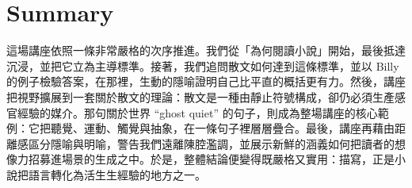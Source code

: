 \section{Summary}

這場講座依照一條非常嚴格的次序推進。我們從「為何閱讀小說」開始，最後抵達沉浸，並把它立為主導標準。接著，我們追問散文如何達到這條標準，並以 Billy 的例子檢驗答案，在那裡，生動的隱喻證明自己比平直的概括更有力。然後，講座把視野擴展到一套關於散文的理論：散文是一種由靜止符號構成，卻仍必須生產感官經驗的媒介。那句關於世界 ``ghost quiet'' 的句子，則成為整場講座的核心範例：它把聽覺、運動、觸覺與抽象，在一條句子裡層層疊合。最後，講座再藉由距離感區分隱喻與明喻，警告我們遠離陳腔濫調，並展示新鮮的涵義如何把讀者的想像力招募進場景的生成之中。於是，整體結論便變得既嚴格又實用：描寫，正是小說把語言轉化為活生生經驗的地方之一。
